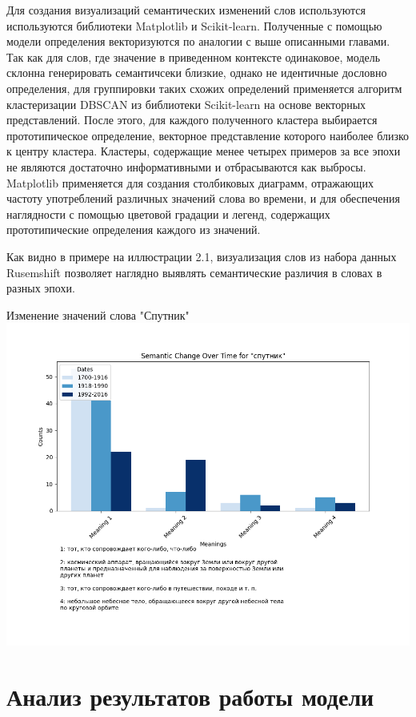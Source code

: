 \documentclass[LI,VKR]{HSEUniversity}
\begin{document}
Для создания визуализаций семантических изменений слов используются используются библиотеки
Matplotlib и Scikit-learn.
Полученные с помощью модели определения векторизуются по аналогии с выше описанными главами.
Так как для слов, где значение в приведенном контексте одинаковое,
модель склонна генерировать семантичсеки близкие, однако не идентичные дословно определения,
для группировки таких схожих определений применяется алгоритм кластеризации DBSCAN из
библиотеки Scikit-learn на основе векторных представлений.
После этого, для каждого полученного кластера выбирается прототипическое определение,
векторное представление которого наиболее близко к центру кластера.
Кластеры, содержащие менее четырех примеров за все эпохи не являются достаточно информативными
и отбрасываются как выбросы.
Matplotlib применяется для создания столбиковых диаграмм,
отражающих частоту употреблений различных значений слова во времени,
и для обеспечения наглядности с помощью цветовой градации и легенд,
содержащих прототипические определения каждого из значений.

Как видно в примере на иллюстрации 2.1, визуализация слов из набора данных Rusemshift
позволяет наглядно выявлять семантические различия в словах в разных эпохи.

\begin{FIGURE}[h]{Изменение значений слова "Спутник" \label{fig:example-figure-2}}
	\includegraphics[width=1.0\textwidth]{img/Figure_Sputnik_2}
\end{FIGURE}

\chapter{Анализ результатов работы модели}
\end{document}
